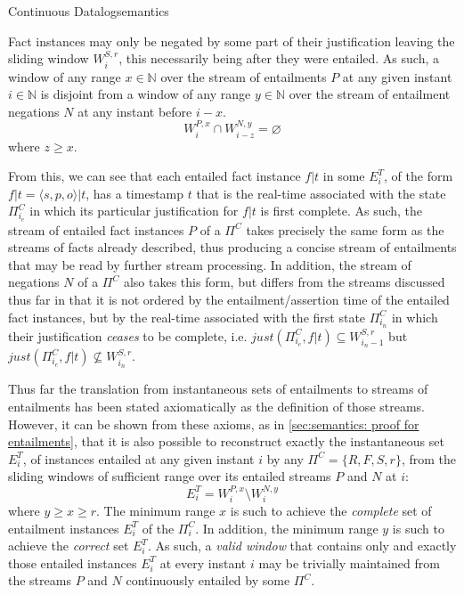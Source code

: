 \begin{nestedsection}{Continuous Datalog}{semantics}
\begin{axiom}
\label{axiom:continuous datalog: entailment precedes negation}
Fact instances may only be negated by some part of their justification leaving
the sliding window $W^{S,r}_{i}$, this necessarily being after they
were entailed.  As such, a window of any range ${x \in \mathbb{N}}$
over the stream of entailments $P$ at any given instant ${i \in \mathbb{N}}$
is disjoint from a window of any range ${y \in \mathbb{N}}$ over the
stream of entailment negations $N$ at any instant before ${i - x}$.
\begin{equation*}
W^{P,x}_{i} \cap W^{N,y}_{i-z} = \varnothing
\end{equation*}
where $z \geq x$.
\end{axiom}

From this, we can see that each entailed fact instance ${f|t}$ in some
$E^T_{i}$, of the form ${f|t = \langle s, p, o \rangle | t}$, has a
timestamp $t$ that is the real-time associated with the state
$\Pi^C_{i_{e}}$ in which its particular justification for ${f|t}$ is
first complete. As such, the stream of entailed fact instances $P$ of
a $\Pi^C$ takes precisely the same form as the streams of facts already
described, thus producing a concise stream of entailments that may be
read by further stream processing.  In addition, the stream of negations
$N$ of a $\Pi^C$ also takes this form, but differs from the streams
discussed thus far in that it is not ordered by the entailment/assertion
time of the entailed fact instances, but by the real-time associated
with the first state $\Pi^C_{i_{n}}$ in which their justification
\emph{ceases} to be complete, i.e. ${just(\Pi^C_{i_{e}}, f|t) \subseteq W^{S,r}_{i_n - 1}}$
but ${just(\Pi^C_{i_{e}}, f|t) \not\subseteq W^{S,r}_{i_n}}$.

Thus far the translation from instantaneous sets of entailments to
streams of entailments has been stated axiomatically as the definition
of those streams.  However, it can be shown from these axioms, as in
\ref{sec:semantics: proof for entailments}, that it is also possible
to reconstruct exactly the instantaneous set $E^T_{i}$, of instances
entailed at any given instant $i$ by any $\Pi^C = \{ R, F, S, r \}$,
from the sliding windows of sufficient range over its entailed streams
$P$ and $N$ at $i$:
\[ E^T_{i} = W^{P,x}_{i} \setminus W^{N,y}_{i} \]
where ${y \geq x \geq r}$. The minimum range $x$ is such to achieve
the \emph{complete} set of entailment instances $E^T_{i}$ of the
$\Pi^C_{i}$. In addition, the minimum range $y$ is such to achieve the
\emph{correct} set $E^T_{i}$. As such, a \emph{valid window} that
contains only and exactly those entailed instances $E^T_{i}$ at every
instant $i$ may be trivially maintained from the streams $P$ and $N$
continuously entailed by some $\Pi^C$.


\end{nestedsection}
